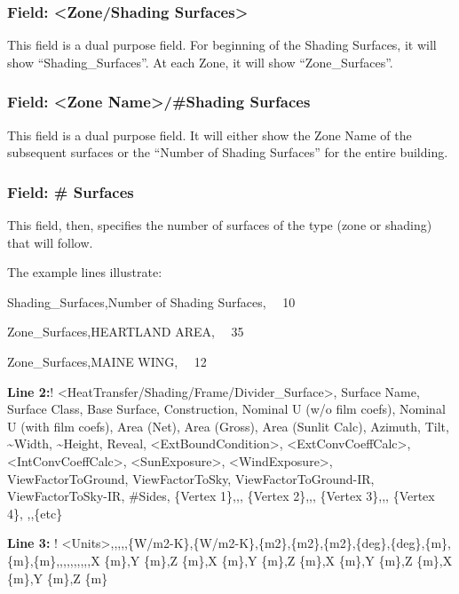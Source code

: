 \subsubsection{Field: \textless{}Zone/Shading Surfaces\textgreater{}}\label{field-zoneshading-surfaces}

This field is a dual purpose field. For beginning of the Shading Surfaces, it will show ``Shading\_Surfaces''. At each Zone, it will show ``Zone\_Surfaces''.

\subsubsection{Field: \textless{}Zone Name\textgreater{}/\#Shading Surfaces}\label{field-zone-nameshading-surfaces}

This field is a dual purpose field. It will either show the Zone Name of the subsequent surfaces or the ``Number of Shading Surfaces'' for the entire building.

\subsubsection{Field: \# Surfaces}\label{field-surfaces}

This field, then, specifies the number of surfaces of the type (zone or shading) that will follow.

The example lines illustrate:

Shading\_Surfaces,Number of Shading Surfaces,~~ 10

Zone\_Surfaces,HEARTLAND AREA,~~ 35

Zone\_Surfaces,MAINE WING,~~ 12

\textbf{Line 2:}! \textless{}HeatTransfer/Shading/Frame/Divider\_Surface\textgreater{}, Surface Name, Surface Class, Base Surface, Construction, Nominal U (w/o film coefs), Nominal U (with film coefs), Area (Net), Area (Gross), Area (Sunlit Calc), Azimuth, Tilt, \textasciitilde{}Width, \textasciitilde{}Height, Reveal, \textless{}ExtBoundCondition\textgreater{}, \textless{}ExtConvCoeffCalc\textgreater{}, \textless{}IntConvCoeffCalc\textgreater{}, \textless{}SunExposure\textgreater{}, \textless{}WindExposure\textgreater{}, ViewFactorToGround, ViewFactorToSky, ViewFactorToGround-IR, ViewFactorToSky-IR, \#Sides, \{Vertex 1\},,, \{Vertex 2\},,, \{Vertex 3\},,, \{Vertex 4\}, ,,\{etc\}

\textbf{Line 3:} ! \textless{}Units\textgreater{},,,,,\{W/m2-K\},\{W/m2-K\},\{m2\},\{m2\},\{m2\},\{deg\},\{deg\},\{m\},\{m\},\{m\},,,,,,,,,,X \{m\},Y \{m\},Z \{m\},X \{m\},Y \{m\},Z \{m\},X \{m\},Y \{m\},Z \{m\},X \{m\},Y \{m\},Z \{m\}

